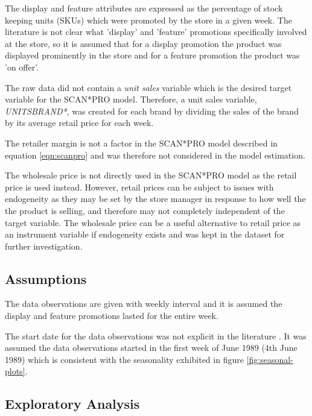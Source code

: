 \documentclass[a4paper,11pt]{article}
\begin{document}
The display and feature attributes are expressed as the percentage of stock keeping units (SKUs) which were promoted by the store in a given week. The literature \citep{srinivasan_promotions_2004} is not clear what 'display' and 'feature' promotions specifically involved at the store, so it is assumed that for a display promotion the product was displayed prominently in the store and for a feature promotion the product was 'on offer'. 

The raw data did not contain a \textit{unit sales} variable which is the desired target variable for the SCAN*PRO model. Therefore, a unit sales variable, \textit{UNITSBRAND*}, was created for each brand by dividing the sales of the brand by its average retail price for each week.

The retailer margin is not a factor in the SCAN*PRO model described in equation \ref{eqn:scanpro} and was therefore not considered in the model estimation.

The wholesale price is not directly used in the SCAN*PRO model as the retail price is used instead. However, retail prices can be subject to issues with endogeneity as they may be set by the store manager in response to how well the the product is selling, and therefore may not completely independent of the target variable. The wholesale price can be a useful alternative to retail price as an instrument variable if endogeneity exists and was kept in the dataset for further investigation.



\subsection{Assumptions}
The data observations are given with weekly interval and it is assumed the display and feature promotions lasted for the entire week.

The start date for the data observations was not explicit in the literature \citep{srinivasan_promotions_2004}. It was assumed the data observations started in the first week of June 1989 (4th June 1989) which is consistent with the seasonality exhibited in figure \ref{fig:seasonal-plots}.

\subsection{Exploratory Analysis}
\end{document}
